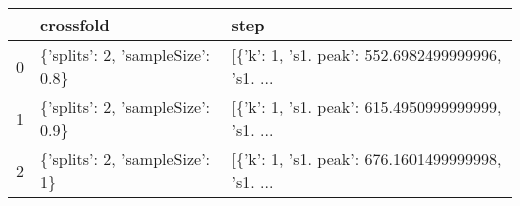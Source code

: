 \begin{tabular}{lll}
\toprule
{} &                         crossfold &                                               step \\
\midrule
0 &  \{'splits': 2, 'sampleSize': 0.8\} &  [\{'k': 1, 's1. peak': 552.6982499999996, 's1. ... \\
1 &  \{'splits': 2, 'sampleSize': 0.9\} &  [\{'k': 1, 's1. peak': 615.4950999999999, 's1. ... \\
2 &    \{'splits': 2, 'sampleSize': 1\} &  [\{'k': 1, 's1. peak': 676.1601499999998, 's1. ... \\
\bottomrule
\end{tabular}
